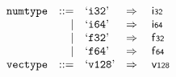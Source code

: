 \vspace{1ex}

$$
\begin{array}[t]{@{}lrrl@{}l@{}l@{}l@{}}
& {\mathtt{numtype}} & ::= & \mbox{‘\texttt{i32}’} & \quad\Rightarrow\quad{} & \mathsf{i{\scriptstyle 32}} \\
& & | & \mbox{‘\texttt{i64}’} & \quad\Rightarrow\quad{} & \mathsf{i{\scriptstyle 64}} \\
& & | & \mbox{‘\texttt{f32}’} & \quad\Rightarrow\quad{} & \mathsf{f{\scriptstyle 32}} \\
& & | & \mbox{‘\texttt{f64}’} & \quad\Rightarrow\quad{} & \mathsf{f{\scriptstyle 64}} \\
& {\mathtt{vectype}} & ::= & \mbox{‘\texttt{v128}’} & \quad\Rightarrow\quad{} & \mathsf{v{\scriptstyle 128}} \\
\end{array}
$$

\vspace{1ex}

